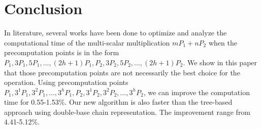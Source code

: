 \section{Conclusion}

In literature, several works have been done to optimize and analyze the computational time of
the multi-scalar multiplication $mP_1 + nP_2$ when the precomputation points is in the form
$P_1, 3P_1, 5P_1, \dots, (2h + 1)P_1, P_2, 3P_2, 5P_2, \dots, (2h + 1)P_2$.
We show in this paper that those precomputation points are not necessarily the best choice for the operation.
Using precomputation points $P_1, 3^1P_1, 3^2P_1, \dots, 3^hP_1, P_2, 3^1P_2, 3^2P_2, \dots, 3^hP_2$,
we can improve the computation time for 0.55-1.53\%.
Our new algorithm is also faster than the tree-based approach using double-base chain representation.
The improvement range from 4.41-5.12\%.







